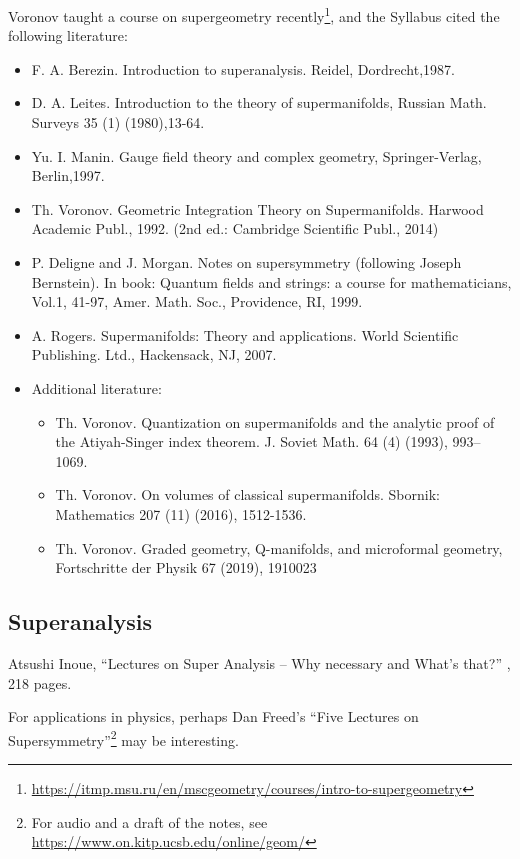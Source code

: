 Voronov taught a course on supergeometry recently\footnote{\url{https://itmp.msu.ru/en/mscgeometry/courses/intro-to-supergeometry}}, and the Syllabus
cited the following literature:
\begin{itemize}
\item F. A. Berezin. Introduction to superanalysis. Reidel, Dordrecht,1987.
\item D. A. Leites. Introduction to the theory of supermanifolds, Russian Math. Surveys 35 (1) (1980),13-64.
\item Yu. I. Manin. Gauge field theory and complex geometry, Springer-Verlag, Berlin,1997.
\item Th. Voronov. Geometric Integration Theory on Supermanifolds. Harwood Academic Publ., 1992. (2nd ed.: Cambridge Scientific Publ., 2014)
\item P. Deligne and J. Morgan. Notes on supersymmetry (following Joseph Bernstein). In book: Quantum fields and strings: a course for mathematicians, Vol.1, 41-97, Amer. Math. Soc., Providence, RI, 1999.
\item A. Rogers. Supermanifolds: Theory and applications. World Scientific Publishing. Ltd., Hackensack, NJ, 2007.
\item Additional literature:
  \begin{itemize}
  \item Th. Voronov.  Quantization on supermanifolds and the analytic proof of the Atiyah-Singer index theorem. J. Soviet Math. 64 (4) (1993),  993--1069.
  \item Th. Voronov. On volumes of  classical supermanifolds. Sbornik: Mathematics 207 (11) (2016), 1512-1536.
  \item Th. Voronov.  Graded geometry, Q-manifolds, and microformal geometry, Fortschritte der Physik 67 (2019), 1910023%
  \end{itemize}
\end{itemize}

\subsection{Superanalysis}

\begin{enumerate}[resume,label={[\arabic*]}]
\item Atsushi Inoue,
  ``Lectures on Super Analysis -- Why necessary and What's that?''
  , 218 pages.
\end{enumerate}
For applications in physics, perhaps Dan Freed's ``Five Lectures on Supersymmetry''\footnote{For
audio and a draft of the notes, see
\url{https://www.on.kitp.ucsb.edu/online/geom/}}
may be interesting.